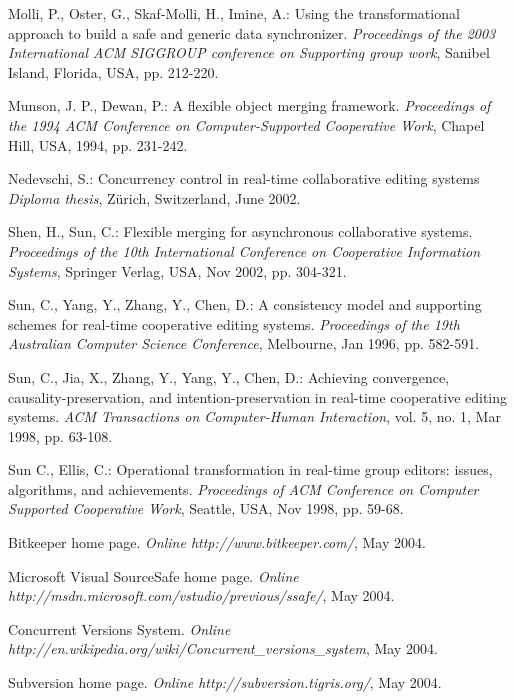 \begin{thebibliography}{99}
 Molli, P., Oster, G., Skaf-Molli, H., Imine, A.: Using the transformational approach to build a safe and generic data synchronizer.
\textit{Proceedings of the 2003 International ACM SIGGROUP conference on Supporting group work}, Sanibel Island, Florida, USA, pp. 212-220.

 Munson, J. P., Dewan, P.: A flexible object merging framework.
\textit{Proceedings of the 1994 ACM Conference on Computer-Supported Cooperative Work}, Chapel Hill, USA, 1994, pp. 231-242.

 Nedevschi, S.: Concurrency control in real-time collaborative editing systems
\textit{Diploma thesis}, Z\"{u}rich, Switzerland, June 2002.

 Shen, H., Sun, C.: Flexible merging for asynchronous collaborative systems.
\textit{Proceedings of the 10th International Conference on Cooperative Information Systems}, Springer Verlag, USA, Nov 2002, pp. 304-321.

 Sun, C., Yang, Y., Zhang, Y., Chen, D.: A consistency model and supporting schemes for real-time cooperative editing systems.
\textit{Proceedings of the 19th Australian Computer Science Conference}, Melbourne, Jan 1996, pp. 582-591.

 Sun, C., Jia, X., Zhang, Y., Yang, Y., Chen, D.: Achieving convergence, causality-preservation, and intention-preservation in real-time cooperative editing systems.
\textit{ACM Transactions on Computer-Human Interaction}, vol. 5, no. 1, Mar 1998, pp. 63-108.

 Sun C., Ellis, C.: Operational transformation in real-time group editors: issues, algorithms, and achievements.
\textit{Proceedings of ACM Conference on Computer Supported Cooperative Work}, Seattle, USA, Nov 1998, pp. 59-68.

 Bitkeeper home page.
\textit{Online http://www.bitkeeper.com/}, May 2004.

 Microsoft Visual SourceSafe home page.
\textit{Online http://msdn.microsoft.com/vstudio/previous/ssafe/}, May 2004.

 Concurrent Versions System.
\textit{Online http://en.wikipedia.org/wiki/Concurrent\_versions\_system}, May 2004.

 Subversion home page.
\textit{Online http://subversion.tigris.org/}, May 2004.

\end{thebibliography}